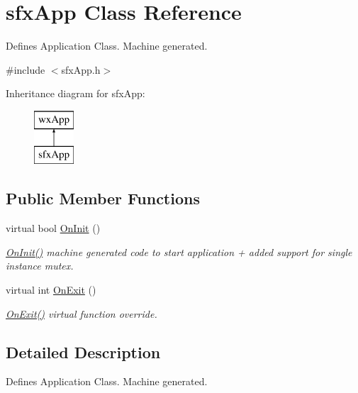 \hypertarget{classsfx_app}{\section{sfx\-App Class Reference}
\label{classsfx_app}
}


Defines Application Class. Machine generated.  




{\ttfamily \#include $<$sfx\-App.\-h$>$}

Inheritance diagram for sfx\-App\-:\begin{figure}[H]
\begin{center}
\leavevmode
\includegraphics[height=2.000000cm]{classsfx_app}
\end{center}
\end{figure}
\subsection*{Public Member Functions}
\begin{DoxyCompactItemize}
\item 
virtual bool \hyperlink{classsfx_app_a227d3ad9e2fdb29c7dd7b2204f61577c}{On\-Init} ()
\begin{DoxyCompactList}\small\item\em \hyperlink{classsfx_app_a227d3ad9e2fdb29c7dd7b2204f61577c}{On\-Init()} machine generated code to start application + added support for single instance mutex. \end{DoxyCompactList}\item 
virtual int \hyperlink{classsfx_app_ab037c140aacb6010a5015f0d358e5b92}{On\-Exit} ()
\begin{DoxyCompactList}\small\item\em \hyperlink{classsfx_app_ab037c140aacb6010a5015f0d358e5b92}{On\-Exit()} virtual function override. \end{DoxyCompactList}\end{DoxyCompactItemize}


\subsection{Detailed Description}
Defines Application Class. Machine generated. 

